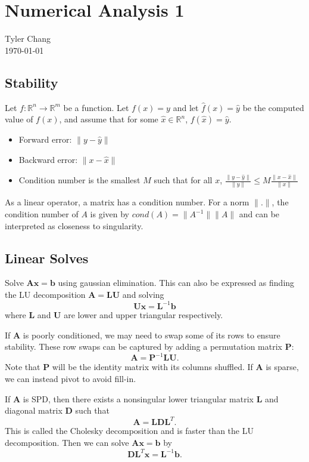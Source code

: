 \documentclass[12pt]{article}
\begin{document}
\section*{Numerical Analysis 1}
Tyler Chang\\
\today

\subsection*{Stability}

Let $f : \mathbb{R}^n \rightarrow \mathbb{R}^m$ be a function.
Let $f(x) = y$ and let $\hat{f}(x) = \hat{y}$ be the computed value of $f(x)$,
and assume that for some $\hat{x} \in \mathbb{R}^n$, $f(\hat{x}) = \hat{y}$.
\begin{itemize}
\item Forward error: $\|y - \hat{y}\|$
\item Backward error: $\|x - \hat{x}\|$
\item Condition number is the smallest $M$ such that for all $x$, $\frac{\|y - \hat{y}\|}{\|y\|} \leq M\frac{\|x - \hat{x}\|}{\|x\|}$
\end{itemize}

As a linear operator, a matrix has a condition number.
For a norm $\|.\|$, the condition number of $A$ is given by 
$cond(A) = \|A^{-1}\|\|A\|$ and can be interpreted as closeness to singularity.

\subsection*{Linear Solves}

Solve $\mathbf{Ax} = \mathbf{b}$ using gaussian elimination.
This can also be expressed as finding the LU decomposition 
$\mathbf{A} = \mathbf{LU}$ and solving 
$$\mathbf{Ux} = \mathbf{L}^{-1}\mathbf{b}$$ where $\mathbf{L}$ and $\mathbf{U}$
are lower and upper triangular respectively.

If $\mathbf{A}$ is poorly conditioned, we may need to swap some of its rows to 
ensure stability.
These row swaps can be captured by adding a permutation matrix $\mathbf{P}$:
$$
\mathbf{A} = \mathbf{P}^{-1}\mathbf{LU}.
$$
Note that $\mathbf{P}$ will be the identity matrix with its columns shuffled.
If $\mathbf{A}$ is sparse, we can instead pivot to avoid fill-in.

If $\mathbf{A}$ is SPD, then there exists a nonsingular lower triangular matrix
$\mathbf{L}$ and diagonal matrix $\mathbf{D}$ such that 
$$\mathbf{A} = \mathbf{LDL}^T.$$
This is called the Cholesky decomposition and is faster than the LU
decomposition.
Then we can solve $\mathbf{Ax} = \mathbf{b}$ by
$$\mathbf{DL}^T\mathbf{x} = \mathbf{L}^{-1}\mathbf{b}.$$
\end{document}
